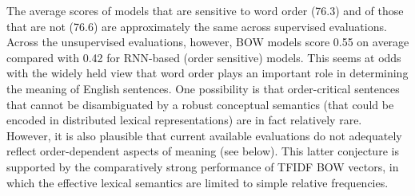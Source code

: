   
%
%
%
%
%
%


\vspace{5pt} 
The average scores of models that are sensitive to word order (76.3) and of those that are not (76.6) are approximately the same across supervised evaluations. Across the unsupervised evaluations, however, BOW models score 0.55 on average compared with 0.42 for RNN-based (order sensitive) models. This seems at odds with the widely held view that word order plays an important role in determining the meaning of English sentences. One possibility is that order-critical sentences that cannot be disambiguated by a robust conceptual semantics (that could be encoded in distributed lexical representations) are in fact relatively rare. However, it is also plausible that current available evaluations do not adequately reflect order-dependent aspects of meaning (see below). This latter conjecture is supported by the comparatively strong performance of TFIDF BOW vectors, in which the effective lexical semantics are limited to simple relative frequencies.  

